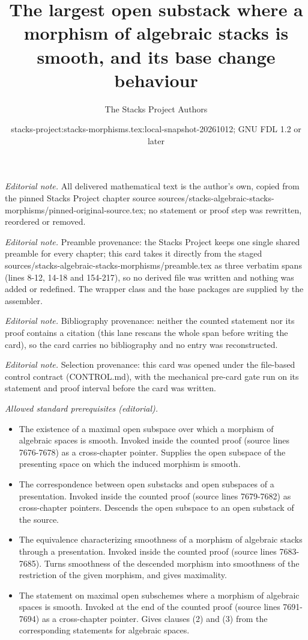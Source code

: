 \documentclass[10pt,a4paper]{amsart}
\title{The largest open substack where a morphism of algebraic stacks is smooth, and its base change behaviour}
\author{The Stacks Project Authors}
\date{stacks-project:stacks-morphisms.tex:local-snapshot-20261012; GNU FDL 1.2 or later}
\theoremstyle{plain}
\theoremstyle{definition}
\theoremstyle{remark}
\numberwithin{equation}{subsection}
\begin{document}
\maketitle
\noindent\textit{Editorial note.} All delivered mathematical text is the author's own, copied from the pinned Stacks Project chapter source sources/stacks-algebraic-stacks-morphisms/pinned-original-source.tex; no statement or proof step was rewritten, reordered or removed.\par\medskip
\noindent\textit{Editorial note.} Preamble provenance: the Stacks Project keeps one single shared preamble for every chapter; this card takes it directly from the staged sources/stacks-algebraic-stacks-morphisms/preamble.tex as three verbatim spans (lines 8-12, 14-18 and 154-217), so no derived file was written and nothing was added or redefined. The wrapper class and the base packages are supplied by the assembler.\par\medskip
\noindent\textit{Editorial note.} Bibliography provenance: neither the counted statement nor its proof contains a citation (this lane rescans the whole span before writing the card), so the card carries no bibliography and no entry was reconstructed.\par\medskip
\noindent\textit{Editorial note.} Selection provenance: this card was opened under the file-based control contract (CONTROL.md), with the mechanical pre-card gate run on its statement and proof interval before the card was written.\par\medskip
\noindent\textit{Allowed standard prerequisites (editorial).}\begin{itemize}
\item The existence of a maximal open subspace over which a morphism of algebraic spaces is smooth. Invoked inside the counted proof (source lines 7676-7678) as a cross-chapter pointer. Supplies the open subspace of the presenting space on which the induced morphism is smooth.
\item The correspondence between open substacks and open subspaces of a presentation. Invoked inside the counted proof (source lines 7679-7682) as cross-chapter pointers. Descends the open subspace to an open substack of the source.
\item The equivalence characterizing smoothness of a morphism of algebraic stacks through a presentation. Invoked inside the counted proof (source lines 7683-7685). Turns smoothness of the descended morphism into smoothness of the restriction of the given morphism, and gives maximality.
\item The statement on maximal open subschemes where a morphism of algebraic spaces is smooth. Invoked at the end of the counted proof (source lines 7691-7694) as a cross-chapter pointer. Gives clauses (2) and (3) from the corresponding statements for algebraic spaces.
\end{itemize}\medskip
\end{document}
